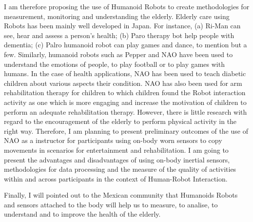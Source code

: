 \documentclass[12pt,journal,onecolumn,compsoc]{IEEEtran}
\begin{document}
I am therefore proposing the use of Humanoid Robots to 
create methodologies for measurement, monitoring and understanding the elderly.
Elderly care using Robots has been mainly well developed in Japan. For instance,
(a) Ri-Man can see, hear and assess a person's health; (b) Paro therapy bot help people with dementia; 
(c) Palro humanoid robot can play games and dance, to mention but a few.
Similarly, humanoid robots such as Pepper and NAO have been used to understand the emotions of people,
to play football or to play games with humans. In the case of health applications, 
NAO has been used to teach diabetic children about various aspects their condition.
NAO has also been used for arm rehabilitation therapy for children to which children found the Robot 
interaction activity as one which is more engaging 
and increase the motivation of children to perform an adequate rehabilitation therapy.
However, there is little research with regard to the encouragement of the elderly to 
perform physical activity in the right way.
Therefore, I am planning to present preliminary outcomes of the use of NAO as a instructor
for participants using on-body worn sensors 
to copy movements in scenarios for entertainment and rehabilitation.
I am going to present the advantages and disadvantages of using on-body inertial sensors,
methodologies for data processing and the measure of the quality of activities 
within and across participants in the context of Human-Robot Interaction.


Finally, I will pointed out to the Mexican community that 
Humanoids Robots and sensors attached to the body 
will help us to measure, to analise, to understand and to improve the health of the elderly.


\end{document}
